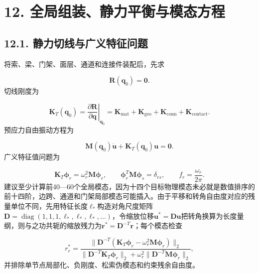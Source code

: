 \documentclass[UTF8,a4paper,11pt,fontset=none]{ctexart}
\begin{document}
\section*{12. 全局组装、静力平衡与模态方程}
\subsection*{12.1. 静力切线与广义特征问题}
将索、梁、门架、面层、通道和连接件装配后，先求\par
\[
\mathbf R(\mathbf q_0)=\mathbf0.
\]
切线刚度为\par
\[
\mathbf K_T(\mathbf q_0)=
\left.
\frac{\partial\mathbf R}{\partial\mathbf q}
\right|_{\mathbf q_0}
=
\mathbf K_{\mathrm{mat}}+
\mathbf K_{\mathrm{geo}}+
\mathbf K_{\mathrm{conn}}+
\mathbf K_{\mathrm{contact}}.
\]
预应力自由振动方程为\par
\[
\mathbf M(\mathbf q_0)\ddot{\mathbf u}
+
\mathbf K_T(\mathbf q_0)\mathbf u=\mathbf0.
\]
广义特征值问题为\par
\[
\mathbf K_T\boldsymbol\phi_r
=\omega_r^2\mathbf M\boldsymbol\phi_r,
\qquad
\boldsymbol\phi_r^T\mathbf M\boldsymbol\phi_s=\delta_{rs},
\qquad
f_r=\frac{\omega_r}{2\pi}.
\]
建议至少计算前40—60个全局模态，因为十四个目标物理模态未必就是数值排序的前十四阶，边跨、通道和门架局部模态可能插入。由于平移和转角自由度对应的残量单位不同，先用特征长度\(\ell_*\)\allowbreak{}构造对角尺度矩阵\(\mathbf D=\operatorname{diag}(1,\allowbreak 1,\allowbreak 1,\allowbreak \ell_*,\allowbreak \ell_*,\allowbreak \ell_*,\allowbreak \ldots)\)\allowbreak{}，令缩放位移\(\mathbf u^*=\mathbf D\mathbf u\)\allowbreak{}把转角换算为长度量纲，则与之功共轭的缩放残力为\(\mathbf r^*=\mathbf D^{-T}\mathbf r\)\allowbreak{}；每个模态检查\par
\[
r_r^{*}=
\frac{
\|\mathbf D^{-T}(\mathbf K_T\boldsymbol\phi_r-
\omega_r^2\mathbf M\boldsymbol\phi_r)\|_2
}{
\|\mathbf D^{-T}\mathbf K_T\boldsymbol\phi_r\|_2+
\omega_r^2\|\mathbf D^{-T}\mathbf M\boldsymbol\phi_r\|_2
},
\]
并排除单节点局部化、负刚度、松索伪模态和约束残余自由度。\par
{}
\end{document}
